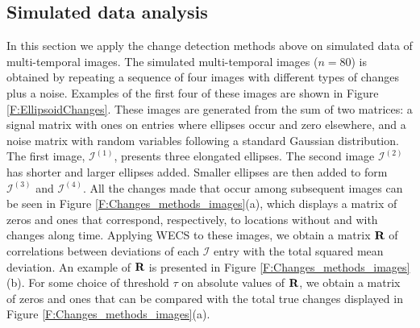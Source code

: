 \documentclass[journal]{IEEEtran}
\newcommand{\vR}{{\textbf R}}
\begin{document}
\subsection{Simulated data analysis}\label{secExpSimulated}

In this section we apply the change detection methods above on simulated data of multi-temporal images. The simulated multi-temporal images ($n=80$) is obtained by repeating a sequence of four images with different types of changes plus a noise. Examples of the first four of these images are shown in Figure \ref{F:EllipsoidChanges}. These images are generated from the sum of two matrices: a signal matrix with ones on entries where ellipses occur and zero elsewhere, and a noise matrix with random variables following a standard Gaussian distribution. The first image, $\mathcal{I}^{(1)}$, presents three elongated ellipses. The second image $\mathcal{I}^{(2)}$ has shorter and larger ellipses added. Smaller ellipses are then added to form $\mathcal{I}^{(3)}$ and $\mathcal{I}^{(4)}$. All the changes made that occur among subsequent images can be seen in Figure \ref{F:Changes_methods_images}(a), which displays a matrix of zeros and ones that correspond, respectively, to locations without and with changes along time. Applying WECS to these images, we obtain a matrix $\vR$ of correlations between deviations of each $\mathcal{I}$ entry with the total squared mean deviation. An example of $\vR$ is presented in Figure \ref{F:Changes_methods_images}(b). For some choice of threshold $\tau$ on absolute values of $\vR$, we obtain a matrix of zeros and ones that can be compared with the total true changes displayed in Figure \ref{F:Changes_methods_images}(a).
\end{document}
